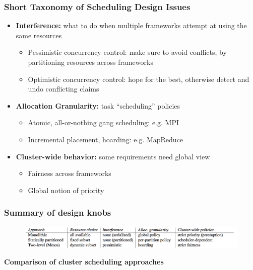 \begin{frame}\frametitle{Short Taxonomy of Scheduling Design Issues}
\begin{itemize}
	\item {\bf Interference:} what to do when multiple frameworks attempt at using the same resources
	\begin{itemize}
		\item Pessimistic concurrency control: make sure to avoid conflicts, by partitioning resources across frameworks
		\item Optimistic concurrency control: hope for the best, otherwise detect and undo conflicting claims
	\end{itemize}

\vspace{20pt}

	\item {\bf Allocation Granularity: } task ``scheduling'' policies
	\begin{itemize}
		\item Atomic, all-or-nothing gang scheduling: e.g. MPI
		\item Incremental placement, hoarding: e.g. MapReduce
	\end{itemize}

\vspace{20pt}

	\item {\bf Cluster-wide behavior: } some requirements need global view
	\begin{itemize}
		\item Fairness across frameworks
		\item Global notion of priority
	\end{itemize}
\end{itemize}
\end{frame}

\begin{frame}\frametitle{Summary of design knobs}
\begin{figure}[h]
  \includegraphics[scale=0.28]{./figures/intro_design}
  \label{fig:intro_design}
\end{figure}

	{\centering \bf Comparison of cluster scheduling approaches}

\end{frame}

